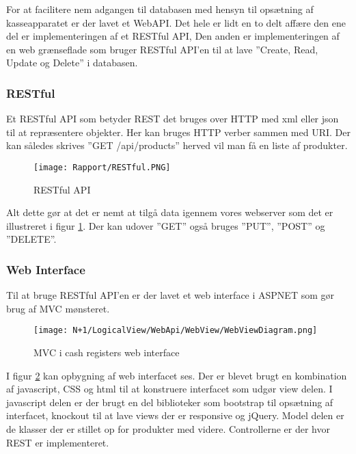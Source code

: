 For at facilitere nem adgangen til databasen med hensyn til 
opsætning af kasseapparatet er der lavet et \gls{WebAPI}. 
Det hele er lidt en to delt affære den ene del er implementeringen af et \gls{RESTful} API,
Den anden er implementeringen af en web grænseflade som bruger \gls{RESTful} API'en til at lave ''Create, Read, Update og Delete'' i databasen.

\subsubsection{RESTful}
Et \gls{RESTful} API som betyder \gls{REST} det bruges over \gls{HTTP} med xml eller json til at repræsentere objekter.
Her kan bruges \gls{HTTP} verber sammen med \gls{URI}.
Der kan således skrives ''GET /api/products'' herved vil man få en liste af produkter.

\begin{figure}[H]
    \centering
	\texttt{[image: Rapport/RESTful.PNG]}
	\caption{RESTful API}
	\label{fig:RESTfulApi}
\end{figure} 

Alt dette gør at det er nemt at tilgå data igennem vores webserver som det er illustreret i figur \ref{fig:RESTfulApi}.
Der kan udover ''GET'' også bruges ''PUT'', ''POST'' og ''DELETE''. 

\subsubsection{Web Interface}
Til at bruge \gls{RESTful} API'en er der lavet et web interface i \gls{ASPNET} som gør brug af \gls{MVC} mønsteret.

\begin{figure}[H]
    \centering
	\texttt{[image: N+1/LogicalView/WebApi/WebView/WebViewDiagram.png]}
	\caption{MVC i cash registers web interface}
	\label{fig:MVCWebApi}
\end{figure} 

I figur \ref{fig:MVCWebApi} kan opbygning af web interfacet ses. 
Der er blevet brugt en kombination af javascript, CSS og html til at konstruere interfacet som udgør view delen.
I javascript delen er der brugt en del biblioteker som bootstrap til opsætning af interfacet, knockout til at lave views der er responsive og jQuery.
Model delen er de klasser der er stillet op for produkter med videre. 
Controllerne er der hvor \gls{REST} er implementeret.

